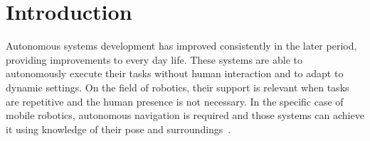 

\chapter{Introduction}
\label{ch:introduction}









\noindent
Autonomous systems development has improved consistently in the later period, providing improvements to every day life.
These systems are able to autonomously execute their tasks without human interaction and to adapt to dynamic settings.
On the field of robotics, their support is relevant when tasks are repetitive and the human presence is not necessary.
In the specific case of mobile robotics, autonomous navigation is required and those systems can achieve it using knowledge of their pose and surroundings~\cite{4140744}.


